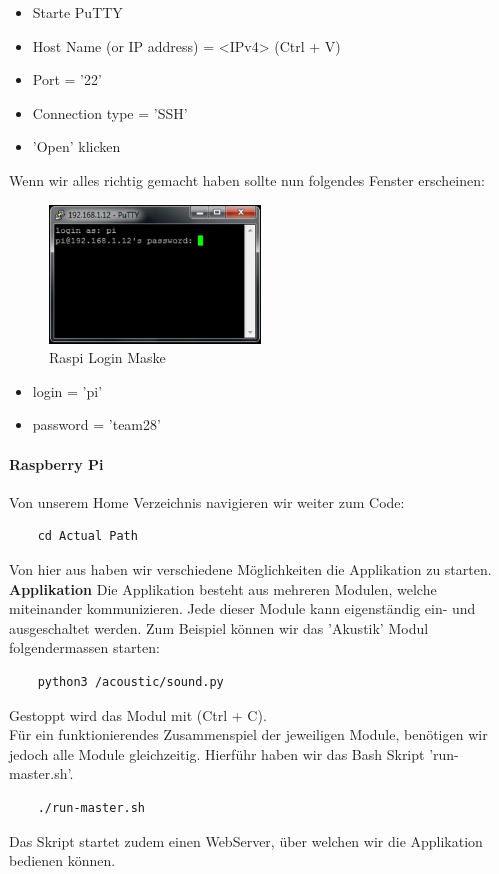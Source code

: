 \documentclass[../../main.tex]{subfiles}
\begin{document}
\begin{itemize}
    \item Starte PuTTY
    \item Host Name (or IP address) = <IPv4> (Ctrl + V)
    \item Port = '22'
    \item Connection type = 'SSH'
    \item 'Open' klicken
\end{itemize}

Wenn wir alles richtig gemacht haben sollte nun folgendes Fenster erscheinen:
\begin{figure}[H] \centering
    \includegraphics[width=0.5\textwidth]{PuttyRaspiLogin}
    \caption{Raspi Login Maske}
    \label{fig:Login}
\end{figure}

\begin{itemize}
    \item login = 'pi'
    \item password = 'team28'
\end{itemize}

\paragraph{Raspberry Pi}
Von unserem Home Verzeichnis navigieren wir weiter zum Code: \\
\begin{lstlisting}
    cd Actual Path
\end{lstlisting}
Von hier aus haben wir verschiedene Möglichkeiten die Applikation zu starten. \\

\textbf{Applikation}
Die Applikation besteht aus mehreren Modulen, welche miteinander kommunizieren. Jede dieser Module kann eigenständig ein- und ausgeschaltet werden. Zum Beispiel können wir das 'Akustik' Modul folgendermassen starten: \\
\begin{lstlisting}
    python3 /acoustic/sound.py
\end{lstlisting}
Gestoppt wird das Modul mit (Ctrl + C).\\
Für ein funktionierendes Zusammenspiel der jeweiligen Module, benötigen wir jedoch alle Module gleichzeitig. Hierführ haben wir das Bash Skript 'run-master.sh'. \\
\begin{lstlisting}
    ./run-master.sh
\end{lstlisting}
Das Skript startet zudem einen WebServer, über welchen wir die Applikation bedienen können. \\
\end{document}
